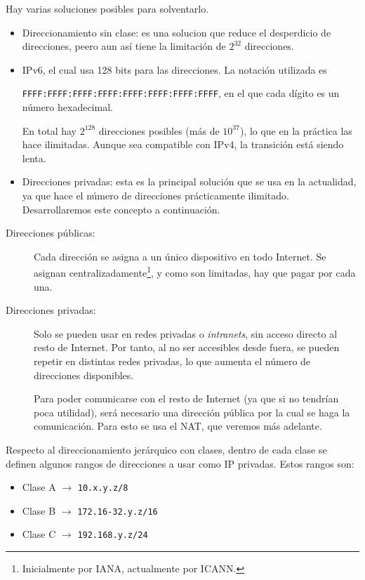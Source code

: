 Hay varias soluciones posibles para solventarlo.
\begin{itemize}
    \item Direccionamiento sin clase: es una solucion que reduce el desperdicio de direcciones, peero aun así tiene la limitación de $2^{32}$ direcciones.
    \item \acrshort{IPv6}, el cual usa 128 bits para las direcciones. La notación utilizada es\

        \verb|FFFF:FFFF:FFFF:FFFF:FFFF:FFFF:FFFF:FFFF|, en el que cada dígito es un número hexadecimal.

    En total hay $2^{128}$ direcciones posibles (más de $10^{37}$), lo que en la práctica las hace ilimitadas. Aunque sea compatible con \acrshort{IPv4}, la transición está siendo lenta.
    \item Direcciones privadas: esta es la principal solución que se usa en la actualidad, ya que hace el número de direcciones prácticamente ilimitado. Desarrollaremos este concepto a continuación.
\end{itemize}

\begin{description}
    \item [Direcciones públicas:] Cada dirección se asigna a un único dispositivo en todo Internet. Se asignan centralizadamente\footnote{Inicialmente por \acrshort{IANA}, actualmente por \acrshort{ICANN}.}, y como son limitadas, hay que pagar por cada una.
    \item [Direcciones privadas:] Solo se pueden usar en redes privadas o \textit{intranets}, sin acceso directo al resto de Internet. Por tanto, al no ser accesibles desde fuera, se pueden repetir en distintas redes privadas, lo que aumenta el número de direcciones disponibles.
    
    Para poder comunicarse con el resto de Internet (ya que si no tendrían poca utilidad), será necesario una dirección pública por la cual se haga la comunicación. Para esto se usa el \acrshort{NAT}, que veremos más adelante.
\end{description}

Respecto al direccionamiento jerárquico con clases, dentro de cada clase se definen algunos rangos de direcciones a usar como IP privadas. Estos rangos son:
\begin{itemize}
    \item Clase A $\rightarrow$ \verb|10.x.y.z/8|
    \item Clase B $\rightarrow$ \verb|172.16-32.y.z/16|
    \item Clase C $\rightarrow$ \verb|192.168.y.z/24|
\end{itemize}



